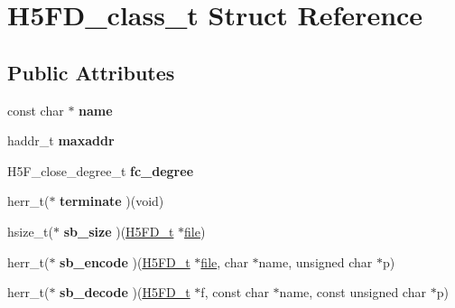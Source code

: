 \hypertarget{struct_h5_f_d__class__t}{}\section{H5\+F\+D\+\_\+class\+\_\+t Struct Reference}
\label{struct_h5_f_d__class__t}
\subsection*{Public Attributes}
\begin{DoxyCompactItemize}
\item 
\mbox{\label{struct_h5_f_d__class__t_af0b8e62584022b03fcb473b546b999bf}} 
const char $\ast$ {\bfseries name}
\item 
\mbox{\label{struct_h5_f_d__class__t_a3f0380bd410bbb0faaf4ef000faef647}} 
haddr\+\_\+t {\bfseries maxaddr}
\item 
\mbox{\label{struct_h5_f_d__class__t_a962784d2788c496b0fe202ebf381cc2a}} 
H5\+F\+\_\+close\+\_\+degree\+\_\+t {\bfseries fc\+\_\+degree}
\item 
\mbox{\label{struct_h5_f_d__class__t_aa24333a3b1a4fd375aaee3094741bdab}} 
herr\+\_\+t($\ast$ {\bfseries terminate} )(void)
\item 
\mbox{\label{struct_h5_f_d__class__t_aa6e9b80a9a9fe9f15c8dc3e1b3e5b2cb}} 
hsize\+\_\+t($\ast$ {\bfseries sb\+\_\+size} )(\hyperlink{struct_h5_f_d__t}{H5\+F\+D\+\_\+t} $\ast$\hyperlink{structfile}{file})
\item 
\mbox{\label{struct_h5_f_d__class__t_ad4cf5516ede510b2c87e0592fc860ccb}} 
herr\+\_\+t($\ast$ {\bfseries sb\+\_\+encode} )(\hyperlink{struct_h5_f_d__t}{H5\+F\+D\+\_\+t} $\ast$\hyperlink{structfile}{file}, char $\ast$name, unsigned char $\ast$p)
\item 
\mbox{\label{struct_h5_f_d__class__t_a85a634d22292654657600ec80e546f66}} 
herr\+\_\+t($\ast$ {\bfseries sb\+\_\+decode} )(\hyperlink{struct_h5_f_d__t}{H5\+F\+D\+\_\+t} $\ast$f, const char $\ast$name, const unsigned char $\ast$p)
\item 

\end{DoxyCompactItemize}
